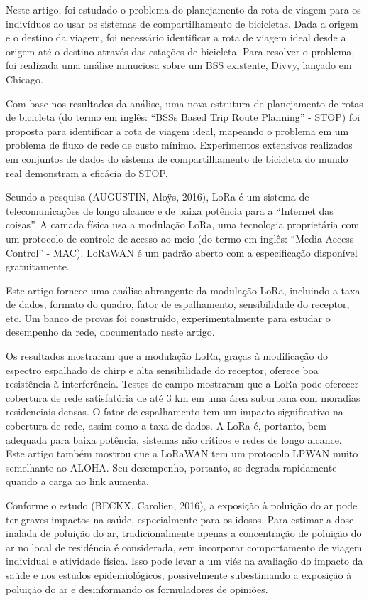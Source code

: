 Neste artigo, foi estudado o problema do planejamento da rota de viagem para os indivíduos ao usar os 
sistemas de compartilhamento de bicicletas. Dada a origem e o destino da viagem, foi necessário 
identificar a rota de viagem ideal desde a origem até o destino através das estações de bicicleta. 
Para resolver o problema, foi realizada uma análise minuciosa sobre um BSS existente, Divvy, lançado 
em Chicago. 

Com base nos resultados da análise, uma nova estrutura de planejamento de rotas de bicicleta (do 
termo em inglês: ``BSSs Based Trip Route Planning'' - STOP) foi proposta para identificar a rota de 
viagem ideal, mapeando o problema em um problema de fluxo de rede de custo mínimo. Experimentos 
extensivos realizados em conjuntos de dados do sistema de compartilhamento de bicicleta do mundo 
real demonstram a eficácia do STOP.

Seundo a pesquisa (AUGUSTIN, Aloÿs, 2016), LoRa é um sistema de telecomunicações de longo alcance e 
de baixa potência para a ``Internet das coisas''. A camada física usa a modulação LoRa, uma tecnologia 
proprietária com um protocolo de controle de acesso ao meio (do termo em inglês: ``Media Access 
Control'' - MAC). LoRaWAN é um padrão aberto com a especificação disponível gratuitamente.

Este artigo fornece uma análise abrangente da modulação LoRa, incluindo a taxa de dados, formato do 
quadro, fator de espalhamento, sensibilidade do receptor, etc. Um banco de provas foi construído, 
experimentalmente para estudar o desempenho da rede, documentado neste artigo. 

Os resultados mostraram que a modulação LoRa, graças à modificação do espectro espalhado de chirp e 
alta sensibilidade do receptor, oferece boa resistência à interferência. Testes de campo mostraram 
que a LoRa pode oferecer cobertura de rede satisfatória de até 3 km em uma área suburbana com 
moradias residenciais densas. O fator de espalhamento tem um impacto significativo na cobertura de 
rede, assim como a taxa de dados. A LoRa é, portanto, bem adequada para baixa potência, sistemas não 
críticos e redes de longo alcance. Este artigo também mostrou que a LoRaWAN tem um protocolo LPWAN 
muito semelhante ao ALOHA. Seu desempenho, portanto, se degrada rapidamente quando a carga no link 
aumenta.

Conforme o estudo (BECKX, Carolien, 2016), a exposição à poluição do ar pode ter graves impactos na 
saúde, especialmente para os idosos. Para estimar a dose inalada de poluição do ar, tradicionalmente 
apenas a concentração de poluição do ar no local de residência é considerada, sem incorporar 
comportamento de viagem individual e atividade física. Isso pode levar a um viés na avaliação do 
impacto da saúde e nos estudos epidemiológicos, possivelmente subestimando a exposição à poluição do 
ar e desinformando os formuladores de opiniões. 

